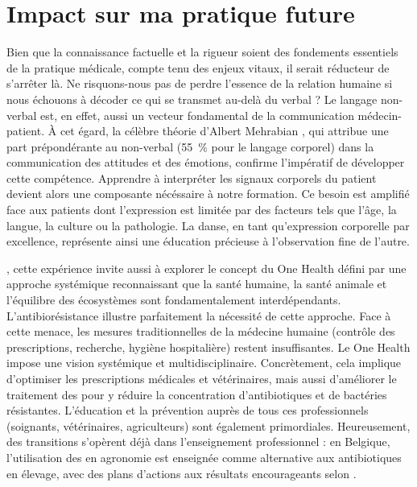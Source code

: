 \section{Impact sur ma pratique future}

Bien que la connaissance factuelle et la rigueur soient des fondements essentiels de la pratique médicale, compte tenu des enjeux vitaux, il serait réducteur de s'arrêter là. Ne risquons-nous pas de perdre l'essence de la relation humaine si nous échouons à décoder ce qui se transmet au-delà du verbal ? Le langage non-verbal est, en effet, aussi un vecteur fondamental de la communication médecin-patient. À cet égard, la célèbre théorie d'Albert Mehrabian \parencite{demetersante2022}, qui attribue une part prépondérante au non-verbal (\qty{55}{\percent} pour le langage corporel) dans la communication des attitudes et des émotions, confirme l'impératif de développer cette compétence. Apprendre à interpréter les signaux corporels du patient devient alors une composante nécéssaire à notre formation. Ce besoin est amplifié face aux patients dont l'expression est limitée par des facteurs tels que l'âge, la langue, la culture ou la pathologie. La danse, en tant qu'expression corporelle par excellence, représente ainsi une éducation précieuse à l'observation fine de l'autre.

, cette expérience invite aussi à explorer le concept du One Health défini par une approche systémique reconnaissant que la santé humaine, la santé animale et l'équilibre des écosystèmes sont fondamentalement interdépendants. L’antibiorésistance illustre parfaitement la nécessité de cette approche. Face à cette menace, les mesures traditionnelles de la médecine humaine (contrôle des prescriptions, recherche, hygiène hospitalière) restent insuffisantes. Le One Health impose une vision systémique et multidisciplinaire. Concrètement, cela implique d'optimiser les prescriptions médicales et vétérinaires, mais aussi d'améliorer le traitement des  pour y réduire la concentration d’antibiotiques et de bactéries résistantes. L'éducation et la prévention auprès de tous ces professionnels (soignants, vétérinaires, agriculteurs) sont également primordiales. Heureusement, des transitions s'opèrent déjà dans l'enseignement professionnel : en Belgique, l'utilisation des  \parencite{siep_formation_524} en agronomie est enseignée comme alternative aux antibiotiques en élevage, avec des plans d'actions aux résultats encourageants selon \textcite{celagri_antibioresistance}.

